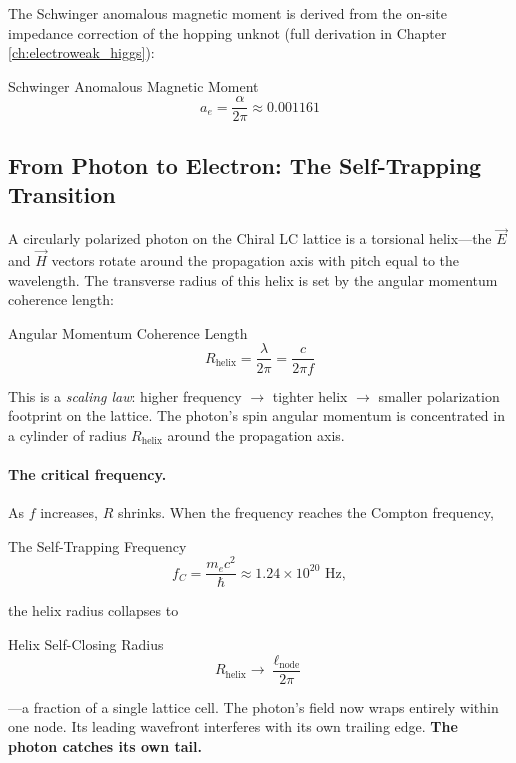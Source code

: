 The Schwinger anomalous magnetic moment is derived from the on-site impedance correction of the hopping unknot (full derivation in Chapter \ref{ch:electroweak_higgs}):
\begin{resultbox}{Schwinger Anomalous Magnetic Moment}
\begin{equation}
    a_e = \frac{\alpha}{2\pi} \approx 0.001161
\end{equation}
\end{resultbox}

\subsection{From Photon to Electron: The Self-Trapping Transition}

A circularly polarized photon on the Chiral LC lattice is a torsional helix---the $\vec{E}$ and $\vec{H}$ vectors rotate around the propagation axis with pitch equal to the wavelength. The transverse radius of this helix is set by the angular momentum coherence length:
\begin{resultbox}{Angular Momentum Coherence Length}
\begin{equation}
    R_{\text{helix}} = \frac{\lambda}{2\pi} = \frac{c}{2\pi f}
\end{equation}
\end{resultbox}
This is a \emph{scaling law}: higher frequency $\to$ tighter helix $\to$ smaller polarization footprint on the lattice. The photon's spin angular momentum is concentrated in a cylinder of radius $R_{\text{helix}}$ around the propagation axis.

\paragraph{The critical frequency.} As $f$ increases, $R$ shrinks. When the frequency reaches the Compton frequency,
\begin{resultbox}{The Self-Trapping Frequency}
\begin{equation}
    f_C = \frac{m_e c^2}{\hbar} \approx 1.24 \times 10^{20} \text{ Hz},
\end{equation}
\end{resultbox}
the helix radius collapses to
\begin{resultbox}{Helix Self-Closing Radius}
\begin{equation}
    R_{\text{helix}} \to \frac{\ell_{\text{node}}}{2\pi}
\end{equation}
\end{resultbox}
---a fraction of a single lattice cell. The photon's field now wraps entirely within one node. Its leading wavefront interferes with its own trailing edge. \textbf{The photon catches its own tail.}

